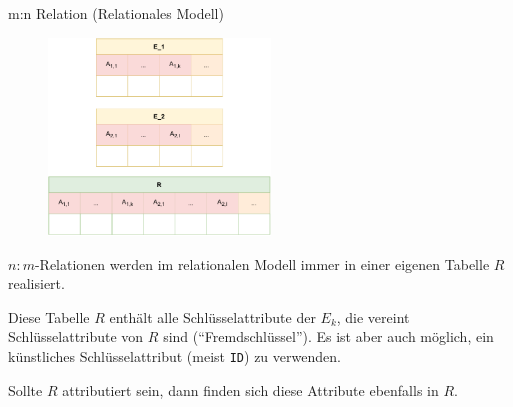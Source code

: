 \begin{defi}{m:n Relation (Relationales Modell)}
    \begin{figure}
        \begin{center}
            \includegraphics[width=0.525\textwidth]{includes/figures/definition_relational_modell_relation_many_to_many.pdf}
        \end{center}
    \end{figure}
    $n:m$-Relationen werden im relationalen Modell immer in einer eigenen Tabelle $R$ realisiert.

    Diese Tabelle $R$ enthält alle Schlüsselattribute der $E_k$, die vereint Schlüsselattribute von $R$ sind (\enquote{Fremdschlüssel}).
    Es ist aber auch möglich, ein künstliches Schlüsselattribut (meist \texttt{ID}) zu verwenden.

    Sollte $R$ attributiert sein, dann finden sich diese Attribute ebenfalls in $R$.

    \vspace{6em}
\end{defi}


